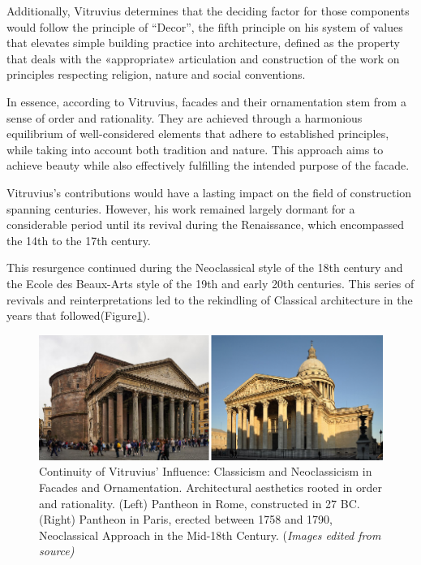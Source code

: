 Additionally, Vitruvius determines that the deciding factor for those components would follow the principle of ``Decor'',  the  fifth  principle on his system of values that elevates simple  building  practice  into  architecture, defined as the property that  deals  with  the  «appropriate»  articulation and construction of the work on principles respecting religion, nature and social conventions\cite{Lefas2000}.

In essence, according to Vitruvius, facades and their ornamentation stem from a sense of order and rationality.
They are achieved through a harmonious equilibrium of well-considered elements that adhere to established principles, while taking into account both tradition and nature.
This approach aims to achieve beauty while also effectively fulfilling the intended purpose of the facade.

Vitruvius's contributions would have a lasting impact on the field of construction spanning centuries.
However, his work remained largely dormant for a considerable period until its revival during the Renaissance, which encompassed the 14th to the 17th century.

This resurgence continued during the Neoclassical style of the 18th century and the Ecole des Beaux-Arts style of the 19th and early 20th centuries.
This series of revivals and reinterpretations led to the rekindling of Classical architecture in the years that followed\cite{Wikipedia2023}(Figure\ref{fig:ClassicismNeoClassicism}).

     \begin{figure}[htb]
          \centering
          \includegraphics[width= \linewidth]{Images/ClassicismNeoClassicism}
          \caption{Continuity of Vitruvius' Influence: Classicism and Neoclassicism in Facades and Ornamentation. Architectural aesthetics rooted in order and rationality. (Left) Pantheon in Rome, constructed in 27 BC. (Right) Pantheon in Paris, erected between 1758 and 1790, Neoclassical Approach in the Mid-18th Century. (\textit{Images edited from source)}}
          \label{fig:ClassicismNeoClassicism}
        \end{figure}

